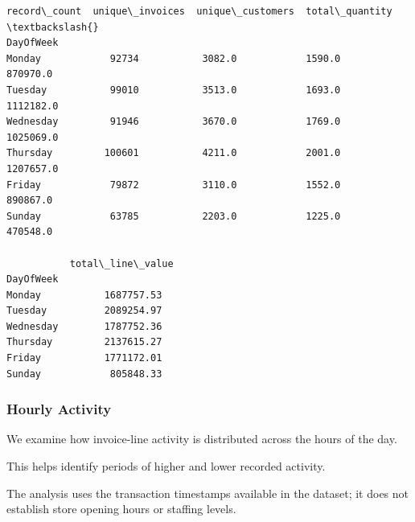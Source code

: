 \documentclass[11pt]{article}
\begin{document}
    
    \begin{Verbatim}[commandchars=\\\{\}]
           record\_count  unique\_invoices  unique\_customers  total\_quantity  \textbackslash{}
DayOfWeek                                                                    
Monday            92734           3082.0            1590.0        870970.0   
Tuesday           99010           3513.0            1693.0       1112182.0   
Wednesday         91946           3670.0            1769.0       1025069.0   
Thursday         100601           4211.0            2001.0       1207657.0   
Friday            79872           3110.0            1552.0        890867.0   
Sunday            63785           2203.0            1225.0        470548.0   

           total\_line\_value  
DayOfWeek                    
Monday           1687757.53  
Tuesday          2089254.97  
Wednesday        1787752.36  
Thursday         2137615.27  
Friday           1771172.01  
Sunday            805848.33  
    \end{Verbatim}

    
    \subsubsection{Hourly Activity}\label{hourly-activity}

We examine how invoice-line activity is distributed across the hours of
the day.

This helps identify periods of higher and lower recorded activity.

The analysis uses the transaction timestamps available in the dataset;
it does not establish store opening hours or staffing levels.
\end{document}
